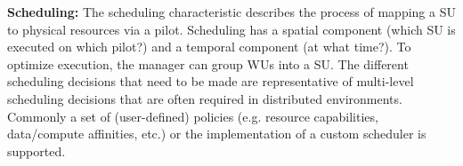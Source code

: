 \documentclass[conference,final]{IEEEtran}
\newcommand{\alnote}[1]{ {\textcolor{blue} { ***andre: #1 }}}
\newcommand{\alnote}[1]{}
\begin{document}
\textbf{Scheduling:} The scheduling characteristic describes the process of
mapping a SU to physical resources via a pilot. Scheduling has a spatial
component (which SU is executed on which pilot?) and a temporal component (at
what time?). To optimize execution, the manager can group WUs into a SU. The
different scheduling decisions that need to be made are representative of
multi-level scheduling decisions that are often required in distributed
environments. Commonly a set of (user-defined) policies (e.g. resource
capabilities, data/compute affinities, etc.) or the implementation of a custom
scheduler is supported.


	
	
\end{document}
